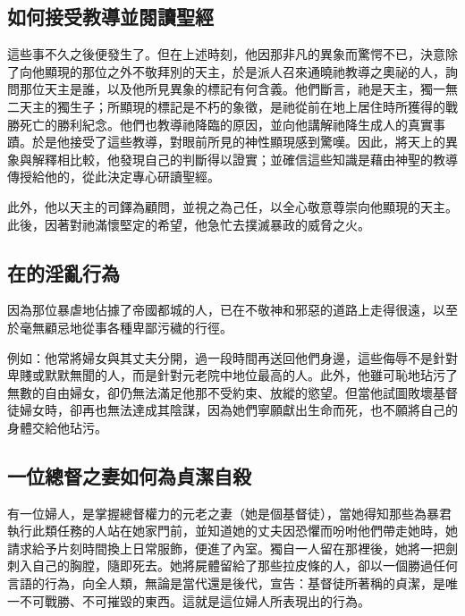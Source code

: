 \subsection{如何接受教導並閱讀聖經}

這些事不久之後便發生了。但在上述時刻，他因那非凡的異象而驚愕不已，決意除了向他顯現的那位之外不敬拜別的天主，於是派人召來通曉祂教導之奧祕的人，詢問那位天主是誰，以及他所見異象的標記有何含義。他們斷言，祂是天主，獨一無二天主的獨生子；所顯現的標記是不朽的象徵，是祂從前在地上居住時所獲得的戰勝死亡的勝利紀念。他們也教導祂降臨的原因，並向他講解祂降生成人的真實事蹟。於是他接受了這些教導，對眼前所見的神性顯現感到驚嘆。因此，將天上的異象與解釋相比較，他發現自己的判斷得以證實；並確信這些知識是藉由神聖的教導傳授給他的，從此決定專心研讀聖經。\par

此外，他以天主的司鐸為顧問，並視之為己任，以全心敬意尊崇向他顯現的天主。此後，因著對祂滿懷堅定的希望，他急忙去撲滅暴政的威脅之火。\par


\subsection{在的淫亂行為}

因為那位暴虐地佔據了帝國都城的人，已在不敬神和邪惡的道路上走得很遠，以至於毫無顧忌地從事各種卑鄙污穢的行徑。\par

例如：他常將婦女與其丈夫分開，過一段時間再送回他們身邊，這些侮辱不是針對卑賤或默默無聞的人，而是針對元老院中地位最高的人。此外，他雖可恥地玷污了無數的自由婦女，卻仍無法滿足他那不受約束、放縱的慾望。但當他試圖敗壞基督徒婦女時，卻再也無法達成其陰謀，因為她們寧願獻出生命而死，也不願將自己的身體交給他玷污。\par


\subsection{一位總督之妻如何為貞潔自殺}

有一位婦人，是掌握總督權力的元老之妻（她是個基督徒），當她得知那些為暴君執行此類任務的人站在她家門前，並知道她的丈夫因恐懼而吩咐他們帶走她時，她請求給予片刻時間換上日常服飾，便進了內室。獨自一人留在那裡後，她將一把劍刺入自己的胸膛，隨即死去。她將屍體留給了那些拉皮條的人，卻以一個勝過任何言語的行為，向全人類，無論是當代還是後代，宣告：基督徒所著稱的貞潔，是唯一不可戰勝、不可摧毀的東西。這就是這位婦人所表現出的行為。\par

